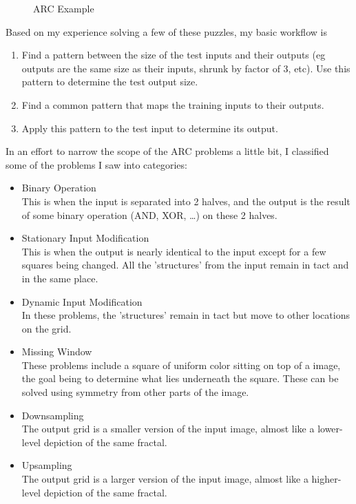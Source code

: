 \documentclass[letterpaper]{article} %
\begin{document}
\begin{figure}[htbp]
\begin{minipage}{0.22\textwidth}
        \caption{ARC Example}
        \label{fig:ex2}
    \end{minipage}
\end{figure}

Based on my experience solving a few of these puzzles, my basic workflow is
\begin{enumerate}
    \item Find a pattern between the size of the test inputs and their outputs (eg outputs are the same size as their inputs, shrunk by factor of 3, etc). Use this pattern to determine the test output size.
    \item Find a common pattern that maps the training inputs to their outputs.
    \item Apply this pattern to the test input to determine its output.
\end{enumerate}

\bigskip

In an effort to narrow the scope of the ARC problems a little bit, I classified some of the problems I saw into categories:


\begin{itemize}
    \item Binary Operation\\
    This is when the input is separated into 2 halves, and the output is the result of some binary operation (AND, XOR, \ldots) on these 2 halves. \\
    \item Stationary Input Modification\\
    This is when the output is nearly identical to the input except for a few squares being changed. All the 'structures' from the input remain in tact and in the same place.\\
    \item Dynamic Input Modification\\
    In these problems, the 'structures' remain in tact but move to other locations on the grid.\\
    \item Missing Window\\
    These problems include a square of uniform color sitting on top of a image, the goal being to determine what lies underneath the square. These can be solved using symmetry from other parts of the image.\\
    \item Downsampling\\
    The output grid is a smaller version of the input image, almost like a lower-level depiction of the same fractal.\\
    \item Upsampling \\
    The output grid is a larger version of the input image, almost like a higher-level depiction of the same fractal.\\
\end{itemize}
\end{document}
